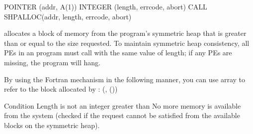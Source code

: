 \synF   %
POINTER (addr, A(1))
INTEGER (length, errcode, abort)
CALL SHPALLOC(addr, length, errcode, abort)
 {   
        allocates a block of memory from the program's symmetric heap
       that is greater than or equal  to  the  size  requested.	  To  maintain symmetric heap 
       consistency,  all  \ac{PE}s in an program must call  with the same 
       value of length; if any  \ac{PE}s  are missing, the program will hang.
       
       By using the Fortran  mechanism in the following manner, you can
       use array  to refer to the block allocated by :  (,
       ())
  }
{
{}
\desR{ }
 {Condition}
 {Length is not an integer greater than }
 { No more memory is available from the system (checked  if the  request  cannot  be	satisfied from the available blocks on the symmetric heap).}
}%

\eAPI 
